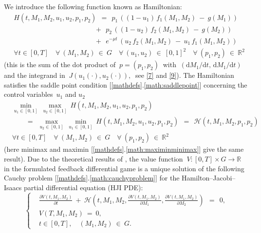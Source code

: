 \documentclass[11pt]{amsart}
\begin{document}
We introduce the following function known as Hamiltonian:
\begin{equation}
\begin{aligned}
& H(t, M_1, M_2, u_1, u_2, p_1, p_2) \:\: = \:\:
p_1 \, \left((1 - u_1) \, f_1(M_1, M_2) \: - \: g(M_1)\right) \\
& \qquad\qquad\qquad\qquad\qquad\quad \:\:\:\,
+ \:\: p_2 \, \left((1 - u_2) \, f_2(M_1, M_2) \: - \: g(M_2)\right) \\
& \qquad\qquad\qquad\qquad\qquad\quad \:\:\:\,
+ \:\: e^{-\mu t} \, (u_2 \, f_2(M_1, M_2) \: - \: u_1 \, f_1(M_1, M_2)) \\
& \forall t \in [0, T] \quad \forall \: (M_1, M_2) \: \in \: G \quad \forall
  \: (u_1, u_2) \: \in \: [0, 1]^2 \quad
\forall \: (p_1, p_2) \: \in \: \mathbb{R}^2
\end{aligned}  \label{12}
\end{equation}
(this is the sum of the dot product of $ \: p = (p_1, p_2) \: $ with
$ \: (\mathrm{d} M_1 / \mathrm{d} t, \, \mathrm{d} M_1 / \mathrm{d} t) \: $ and
the integrand in $ \: J(u_1(\cdot), u_2(\cdot)), \: $ see \cref{7} and
\cref{9}). The Hamiltonian satisfies the saddle point condition [\ref{mathdefs}.\ref{math:saddlepoint}] concerning
the control variables~$ u_1 $ and
$ u_2 $
\begin{equation}
\begin{aligned}
& \min_{u_1 \in [0, 1]} \: \max_{u_2 \in [0, 1]} \: H(t, M_1, M_2, u_1, u_2,
  p_1, p_2) \\
& \qquad
= \:\: \max_{u_2 \in [0, 1]} \: \min_{u_1 \in [0, 1]} \: H(t, M_1, M_2, u_1,
  u_2, p_1, p_2) \:\:
= \:\: \mathcal{H} (t, M_1, M_2, p_1, p_2) \\
& \forall t \in [0, T] \quad \forall \: (M_1, M_2) \: \in \: G \quad \forall
  \: (p_1, p_2) \: \in \: \mathbb{R}^2
\end{aligned}  \label{13}
\end{equation}
(here minimax and maximin [\ref{mathdefs}.\ref{math:maximinminimax}] give the same result). Due to the theoretical
results of \cite[\S XI.6]{FlemingSoner2006}, the value function 
$ \: V \colon [0, T] \times G \to \mathbb{R} \: $ in the formulated feedback
differential game is a unique solution of the following Cauchy problem [\ref{mathdefs}.\ref{math:cauchyproblem}] for the
Hamilton--Jacobi--Isaacs partial differential equation (HJI PDE):
\begin{equation}
\left\{ \begin{aligned}
& \frac{\partial V(t, M_1, M_2)}{\partial t} \: + \: \mathcal{H}
  \left( t, M_1, M_2, \frac{\partial V(t, M_1, M_2)}{\partial M_1},
  \frac{\partial V(t, M_1, M_2)}{\partial M_2} \right) \:\: = \:\: 0, \\
& V(T, M_1, M_2) \: = \: 0, \\
& t \in [0, T], \quad (M_1, M_2) \: \in \: G.
\end{aligned} \right.  \label{15}
\end{equation}
\end{document}
